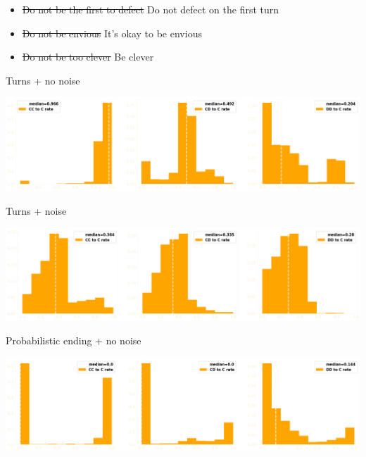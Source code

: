 \documentclass{beamer}
\begin{document}
\begin{frame}
    \begin{itemize}
    \item \st{Do not be the first to defect} Do not defect on the first turn
    \item \st{Do not be envious} It's okay to be envious 
    \item \st{Do not be too clever} Be clever
    \end{itemize}
\end{frame}

\begin{frame}
    \begin{center}
        Turns + no noise \\
        \vspace{.5cm}

    \includegraphics[width=\textwidth]{static/std_states.png}
    \end{center}
\end{frame}

\begin{frame}
    \begin{center}
        Turns + noise \\
        \vspace{.5cm}

    \includegraphics[width=\textwidth]{static/noise_states.png}
    \end{center}
\end{frame}

\begin{frame}
    \begin{center}
        Probabilistic ending + no noise \\
        \vspace{.5cm}

    \includegraphics[width=\textwidth]{static/probend_states.png}
    \end{center}
\end{frame}
\end{document}
